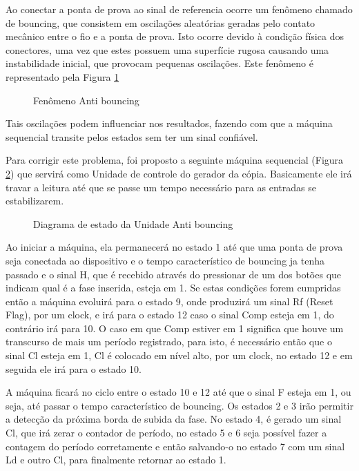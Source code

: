 \documentclass[12pt,a4paper,openany]{abntex2}
\begin{document}
Ao conectar a ponta de prova ao sinal de referencia ocorre um fenômeno chamado de bouncing, que consistem em oscilações aleatórias geradas pelo contato mecânico entre o fio e a ponta de prova. Isto ocorre devido à condição física dos conectores, uma vez que estes possuem uma superfície rugosa causando uma instabilidade inicial, que provocam pequenas oscilações. Este fenômeno é representado pela Figura \ref{fig:bounceTimingDiagram}

\begin{figure}[!htp]
	\centering
	\caption{Fenômeno Anti bouncing}
	\label{fig:bounceTimingDiagram}
\end{figure}

Tais oscilações podem influenciar nos resultados, fazendo com que a máquina sequencial transite pelos estados sem ter um sinal confiável.

Para corrigir este problema, foi proposto a seguinte máquina sequencial (Figura \ref{fig:antibouncing-diagrama}) que servirá como Unidade de controle do gerador da cópia. Basicamente ele irá travar a leitura até que se passe um tempo necessário para as entradas se estabilizarem.

\begin{figure}[!htp]
	\centering
	\caption{Diagrama de estado da Unidade Anti bouncing}
	\label{fig:antibouncing-diagrama}
\end{figure}

Ao iniciar a máquina, ela permanecerá no estado 1 até que uma ponta de prova seja conectada ao dispositivo e o tempo característico de bouncing ja tenha passado e o sinal H, que é recebido através do pressionar de um dos botões que indicam qual é a fase inserida, esteja em 1. Se estas condições forem cumpridas então a máquina evoluirá para o estado 9, onde produzirá um sinal Rf (Reset Flag), por um clock, e irá para o estado 12 caso o sinal Comp esteja em 1, do contrário irá para 10. O caso em que Comp estiver em 1 significa que houve um transcurso de mais um período registrado, para isto, é necessário então que o sinal Cl esteja em 1, Cl é colocado em nível alto, por um clock, no estado 12 e em seguida ele irá para o estado 10.

A máquina ficará no ciclo entre o estado 10 e 12 até que o sinal F esteja em 1, ou seja, até passar o tempo característico de bouncing. Os estados 2 e 3 irão permitir a detecção da próxima borda de subida da fase. No estado 4, é gerado um sinal Cl, que irá zerar o contador de período, no estado 5 e 6 seja possível fazer a contagem do período corretamente e então salvando-o no estado 7 com um sinal Ld e outro Cl, para finalmente retornar ao estado 1.
\end{document}
